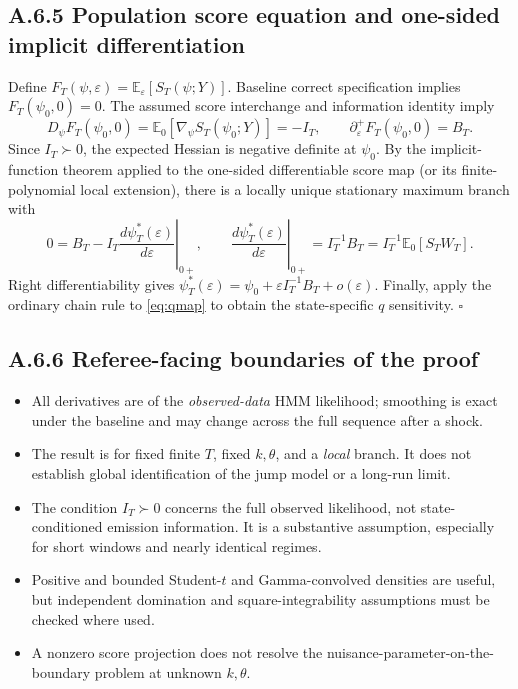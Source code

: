 \documentclass[11pt,a4paper]{article}
\newcommand{\E}{\mathbb E}
\newcommand{\eps}{\varepsilon}
\begin{document}
\subsection*{A.6.5 Population score equation and one-sided implicit differentiation}
Define $F_T(\psi,\eps)=\E_\eps[S_T(\psi;Y)]$. Baseline correct specification implies $F_T(\psi_0,0)=0$. The assumed score interchange and information identity imply
\begin{equation}
D_\psi F_T(\psi_0,0)=\E_0[\nabla_\psi S_T(\psi_0;Y)]=-I_T,\qquad
\partial_\eps^+F_T(\psi_0,0)=B_T.\label{eq:app7}
\end{equation}
Since $I_T\succ0$, the expected Hessian is negative definite at $\psi_0$. By the implicit-function theorem applied to the one-sided differentiable score map (or its finite-polynomial local extension), there is a locally unique stationary maximum branch with
\begin{equation}
0=B_T-I_T\left.\frac{d\psi_T^*(\eps)}{d\eps}\right|_{0+},\qquad
\boxed{\left.\frac{d\psi_T^*(\eps)}{d\eps}\right|_{0+}=I_T^{-1}B_T
=I_T^{-1}\E_0[S_TW_T].}\label{eq:app8}
\end{equation}
Right differentiability gives $\psi_T^*(\eps)=\psi_0+\eps I_T^{-1}B_T+o(\eps)$. Finally, apply the ordinary chain rule to \eqref{eq:qmap} to obtain the state-specific $q$ sensitivity. \hfill$\square$

\subsection*{A.6.6 Referee-facing boundaries of the proof}
\begin{itemize}
\item All derivatives are of the \emph{observed-data} HMM likelihood; smoothing is exact under the baseline and may change across the full sequence after a shock.
\item The result is for fixed finite $T$, fixed $k,\theta$, and a \emph{local} branch. It does not establish global identification of the jump model or a long-run limit.
\item The condition $I_T\succ0$ concerns the full observed likelihood, not state-conditioned emission information. It is a substantive assumption, especially for short windows and nearly identical regimes.
\item Positive and bounded Student-$t$ and Gamma-convolved densities are useful, but independent domination and square-integrability assumptions must be checked where used.
\item A nonzero score projection does not resolve the nuisance-parameter-on-the-boundary problem at unknown $k,\theta$.
\end{itemize}
\end{document}
